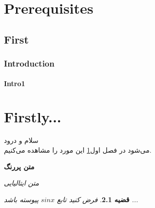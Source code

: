 \documentclass{book}
\author{علی}
\newtheorem{thm}{قضیه}
\begin{document}
	\maketitle
\tableofcontents
\singlespacing

\chapter{Prerequisites}\label{chap1}
\section{First}
\subsection{Introduction}
\subsubsection{Intro1}
\begin{flushleft}
\end{flushleft}

\chapter{Firstly...}\label{chap2}
	 سلام و درود
	 \\
	 می‌شود در فصل اول\ref{chap1} این مورد را مشاهده می‌کنیم.
	 
	 \textbf{متن پررنگ}
	 
	 \textit{متن ایتالیایی}
	 


\begin{thm}
	فرض کنید تابع $sin x$ پیوسته باشد ...
\end{thm}
\end{document}
